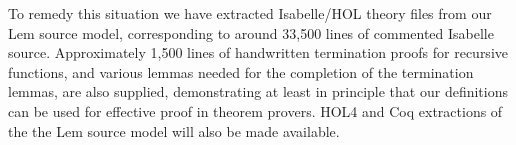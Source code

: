 To remedy this situation we have extracted Isabelle/HOL theory files from our Lem source model, corresponding to around 33,500 lines of commented Isabelle source.
Approximately 1,500 lines of handwritten termination proofs for recursive functions, and various lemmas needed for the completion of the termination lemmas, are also supplied, demonstrating at least in principle that our definitions can be used for effective proof in theorem provers.
HOL4 and Coq extractions of the the Lem source model will also be made available.
